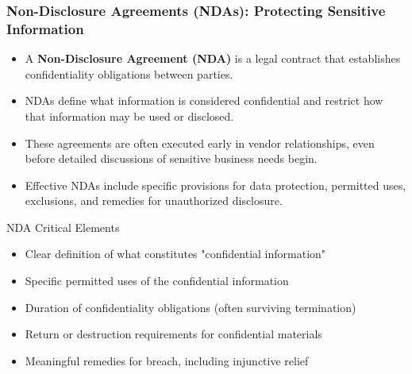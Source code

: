 \documentclass{beamer}
\begin{document}
\begin{frame}
    \frametitle{Non-Disclosure Agreements (NDAs): Protecting Sensitive Information}
    
    \begin{itemize}
        \item A \textbf{Non-Disclosure Agreement (NDA)} is a legal contract that establishes confidentiality obligations between parties.
        \item NDAs define what information is considered confidential and restrict how that information may be used or disclosed.
        \item These agreements are often executed early in vendor relationships, even before detailed discussions of sensitive business needs begin.
        \item Effective NDAs include specific provisions for data protection, permitted uses, exclusions, and remedies for unauthorized disclosure.
    \end{itemize}
    
    \begin{alertblock}{NDA Critical Elements}
        \scriptsize
        \begin{itemize}
            \item Clear definition of what constitutes "confidential information"
            \item Specific permitted uses of the confidential information
            \item Duration of confidentiality obligations (often surviving termination)
            \item Return or destruction requirements for confidential materials
            \item Meaningful remedies for breach, including injunctive relief
        \end{itemize}
    \end{alertblock}
\end{frame}
\end{document}
